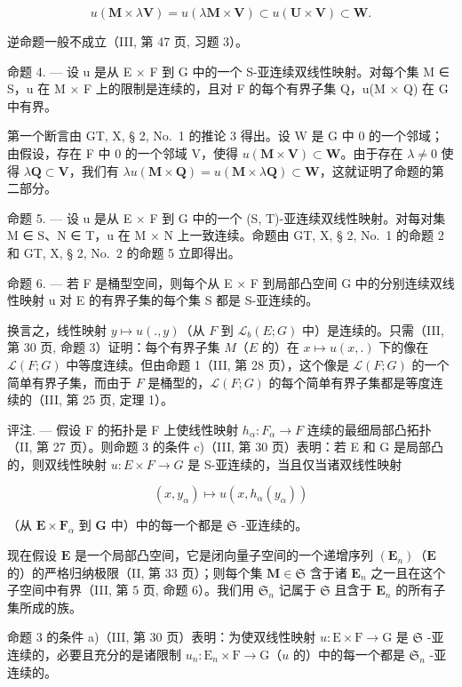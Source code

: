 \[
u (\mathbf {M} \times \lambda \mathbf {V}) = u (\lambda \mathbf {M} \times \mathbf {V}) \subset u (\mathbf {U} \times \mathbf {V}) \subset \mathbf {W}.
\]

逆命题一般不成立（III, 第 47 页, 习题 3）。

命题 4. --- 设 u 是从 E × F 到 G 中的一个 S-亚连续双线性映射。对每个集 M ∈ S，u 在 M × F 上的限制是连续的，且对 F 的每个有界子集 Q，u(M × Q) 在 G 中有界。

第一个断言由 GT, X, § 2, No.~1 的推论 3 得出。设 W 是 G 中 0 的一个邻域；由假设，存在 F 中 0 的一个邻域 V，使得 \(u(\mathbf{M} \times \mathbf{V}) \subset \mathbf{W}\)。由于存在 \(\lambda \neq 0\) 使得 \(\lambda \mathbf{Q} \subset \mathbf{V}\)，我们有 \(\lambda u(\mathbf{M} \times \mathbf{Q}) = u(\mathbf{M} \times \lambda \mathbf{Q}) \subset \mathbf{W}\)，这就证明了命题的第二部分。

命题 5. --- 设 u 是从 E × F 到 G 中的一个 (S, T)-亚连续双线性映射。对每对集 M ∈ S、N ∈ T，u 在 M × N 上一致连续。命题由 GT, X, § 2, No.~1 的命题 2 和 GT, X, § 2, No.~2 的命题 5 立即得出。

命题 6. --- 若 F 是桶型空间，则每个从 E × F 到局部凸空间 G 中的分别连续双线性映射 u 对 E 的有界子集的每个集 S 都是 S-亚连续的。

换言之，线性映射 \(y \mapsto u(., y)\)（从 \(F\) 到 \(\mathcal{L}_b(E; G)\) 中）是连续的。只需（III, 第 30 页, 命题 3）证明：每个有界子集 \(M\)（\(E\) 的）在 \(x \mapsto u(x, .)\) 下的像在 \(\mathcal{L}(F; G)\) 中等度连续。但由命题 1（III, 第 28 页），这个像是 \(\mathcal{L}(F; G)\) 的一个简单有界子集，而由于 \(F\) 是桶型的，\(\mathcal{L}(F; G)\) 的每个简单有界子集都是等度连续的（III, 第 25 页, 定理 1）。

评注. --- 假设 F 的拓扑是 F 上使线性映射 \(h_{\alpha}:F_{\alpha}\to F\) 连续的最细局部凸拓扑（II, 第 27 页）。则命题 3 的条件 c)（III, 第 30 页）表明：若 E 和 G 是局部凸的，则双线性映射 \(u:E\times F\to G\) 是 S-亚连续的，当且仅当诸双线性映射

\[
(x, y _ {\alpha}) \mapsto u (x, h _ {\alpha} (y _ {\alpha}))
\]

（从 \(\mathbf{E} \times \mathbf{F}_{\alpha}\) 到 \(\mathbf{G}\) 中）中的每一个都是 \(\mathfrak{S}\) -亚连续的。

现在假设 \(\mathbf{E}\) 是一个局部凸空间，它是闭向量子空间的一个递增序列 \((\mathbf{E}_n)\)（\(\mathbf{E}\) 的）的严格归纳极限（II, 第 33 页）；则每个集 \(\mathbf{M} \in \mathfrak{S}\) 含于诸 \(\mathbf{E}_n\) 之一且在这个子空间中有界（III, 第 5 页, 命题 6）。我们用 \(\mathfrak{S}_n\) 记属于 \(\mathfrak{S}\) 且含于 \(\mathbf{E}_n\) 的所有子集所成的族。

命题 3 的条件 a)（III, 第 30 页）表明：为使双线性映射 \(u: \mathrm{E} \times \mathrm{F} \to \mathrm{G}\) 是 \(\mathfrak{S}\) -亚连续的，必要且充分的是诸限制 \(u_n: \mathrm{E}_n \times \mathrm{F} \to \mathrm{G}\)（\(u\) 的）中的每一个都是 \(\mathfrak{S}_n\) -亚连续的。


